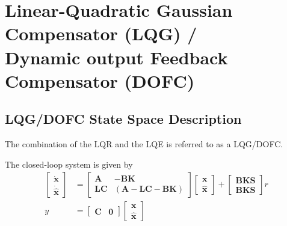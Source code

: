 \section[Linear-Quadratic Gaussian Compensator (LQG) / Dynamic output Feedback Compensator (DOFC)]{Linear-Quadratic Gaussian Compensator (LQG) / \\ Dynamic output Feedback Compensator (DOFC)}

\subsection{LQG/DOFC State Space Description}

The combination of the LQR and the LQE is referred to as a LQG/DOFC.

\newpar{}

\begin{center}
    
\end{center}

The closed-loop system is given by
\begin{align*}
    \begin{bmatrix}
        \dot{\textbf{x}} \\
        \dot{\hat{\textbf{x}}}
    \end{bmatrix}
      & =
    \begin{bmatrix}
        \mathbf{A}  & - \mathbf{BK}                        \\
        \mathbf{LC} & (\mathbf{A}-\mathbf{LC}-\mathbf{BK})
    \end{bmatrix}
    \begin{bmatrix}
        \textbf{x} \\
        \hat{\textbf{x}}
    \end{bmatrix}
    +
    \begin{bmatrix}
        \mathbf{BKS} \\
        \mathbf{BKS}
    \end{bmatrix}
    r                             \\
    y & = \begin{bmatrix}
              \mathbf{C} & \mathbf{0}
          \end{bmatrix}
    \begin{bmatrix}
        \textbf{x} \\
        \hat{\textbf{x}}
    \end{bmatrix}
\end{align*}


